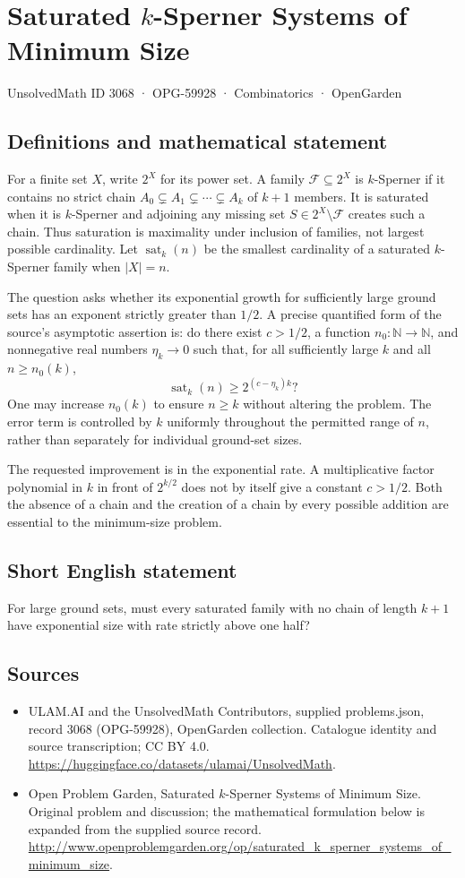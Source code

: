 \documentclass[11pt,a4paper]{article}
\begin{document}
\section*{Saturated $k$-Sperner Systems of Minimum Size}\label{3068}
{\small UnsolvedMath ID 3068 · OPG-59928 · Combinatorics · OpenGarden}
\subsection{Definitions and mathematical statement}
For a finite set $X$, write $2^X$ for its power set. A family
$\mathcal F\subseteq2^X$ is $k$-Sperner if it contains no strict chain
$A_0\subsetneq A_1\subsetneq\cdots\subsetneq A_k$ of $k+1$ members.
It is saturated when it is $k$-Sperner and adjoining any missing set
$S\in2^X\setminus\mathcal F$ creates such a chain. Thus saturation is
maximality under inclusion of families, not largest possible cardinality.
Let $\operatorname{sat}_k(n)$ be the smallest cardinality of a saturated
$k$-Sperner family when $|X|=n$.

The question asks whether its exponential growth for sufficiently large
ground sets has an exponent strictly greater than $1/2$. A precise
quantified form of the source's asymptotic assertion is: do there exist
$c>1/2$, a function $n_0:\mathbb N\to\mathbb N$, and nonnegative real
numbers $\eta_k\to0$ such that, for all sufficiently large $k$ and all
$n\ge n_0(k)$,
\[
 \operatorname{sat}_k(n)\ge 2^{(c-\eta_k)k}?
\]
One may increase $n_0(k)$ to ensure $n\ge k$ without altering the problem.
The error term is controlled by $k$ uniformly throughout the permitted
range of $n$, rather than separately for individual ground-set sizes.

The requested improvement is in the exponential rate. A multiplicative
factor polynomial in $k$ in front of $2^{k/2}$ does not by itself give a
constant $c>1/2$. Both the absence of a chain and the creation of a chain
by every possible addition are essential to the minimum-size problem.
\subsection{Short English statement}
For large ground sets, must every saturated family with no chain of length $k+1$ have exponential size with rate strictly above one half?
\subsection{Sources}
\begin{itemize}
\item[S1] ULAM.AI and the UnsolvedMath Contributors, supplied problems.json, record 3068 (OPG-59928), OpenGarden collection. Catalogue identity and source transcription; CC BY 4.0.
\url{https://huggingface.co/datasets/ulamai/UnsolvedMath}.
\item[S2] Open Problem Garden, Saturated $k$-Sperner Systems of Minimum Size. Original problem and discussion; the mathematical formulation below is expanded from the supplied source record.
\url{http://www.openproblemgarden.org/op/saturated_k_sperner_systems_of_minimum_size}.
\end{itemize}
\end{document}
